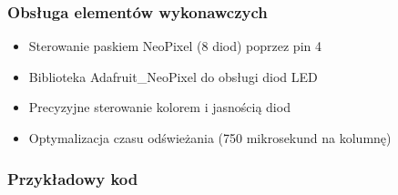 \documentclass{article}
\begin{document}
\subsubsection{Obsługa elementów wykonawczych}
\begin{itemize}
    \item Sterowanie paskiem NeoPixel (8 diod) poprzez pin 4
    \item Biblioteka Adafruit\_NeoPixel do obsługi diod LED
    \item Precyzyjne sterowanie kolorem i jasnością diod
    \item Optymalizacja czasu odświeżania (750 mikrosekund na kolumnę)
\end{itemize}

\subsubsection{Przykładowy kod}
\end{document}
